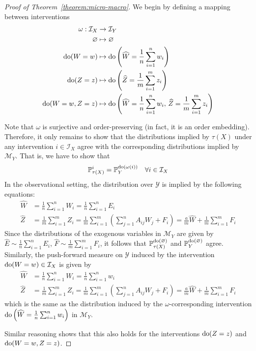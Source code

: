 \begin{proof}[Proof of Theorem~\ref{theorem:micro-macro}]
We begin by defining a mapping between interventions
\begin{align*}
\omega : \mathcal{I}_X &\rightarrow \mathcal{I}_Y \\
\varnothing &\mapsto \varnothing \\
\operatorname{do}(W= w)&\mapsto \operatorname{do}\left(\widehat{W} = \frac{1}{n}\sum_{i=1}^n w_i\right) \\
\operatorname{do}(Z= z)&\mapsto \operatorname{do}\left(\widehat{Z} = \frac{1}{m}\sum_{i=1}^m z_i\right) \\
\operatorname{do}(W=w, Z=z)&\mapsto \operatorname{do}\left(\widehat{W} = \frac{1}{n}\sum_{i=1}^n w_i,\, \widehat{Z} = \frac{1}{m}\sum_{i=1}^m z_i\right)
\end{align*}

Note that $\omega$ is surjective and order-preserving (in fact, it is an order embedding).
Therefore, it only remains to show that the distributions implied by $\tau(X)$ under any intervention $i\in\mathcal{I}_X$ agree with the corresponding distributions implied by $\mathcal{M}_Y$.
That is, we have to show that
\[ \mathbb{P}_{\tau(X)}^{i} = \mathbb{P}_{Y}^{\operatorname{do}(\omega(i))} \quad \forall i\in\mathcal{I}_X \]
%
In the observational setting, the distribution over $\mathcal{Y}$ is implied by the following equations:
%
\begin{align*}
\widehat{W} &= \frac{1}{n}\sum_{i=1}^n W_i = \frac{1}{n}\sum_{i=1}^n E_i \\
\widehat{Z} &= \frac{1}{m}\sum_{i=1}^m Z_i =  \frac{1}{m}\sum_{i=1}^m \left( \sum_{j=1}^n A_{ij}W_j  + F_i\right) = \frac{a}{m}\widehat{W} +  \frac{1}{m}\sum_{i=1}^m F_i
\end{align*}
%
Since the distributions of the exogenous variables in $\mathcal{M}_Y$ are given by $\widehat{E} \sim \frac{1}{n}\sum_{i=1}^n E_i$, $\widehat{F} \sim \frac{1}{m}\sum_{i=1}^m F_i$, it follows that $\mathbb{P}_{\tau(X)}^{\operatorname{do}(\varnothing)}$  and $\mathbb{P}_{Y}^{\operatorname{do}(\varnothing)}$ agree. Similarly, the push-forward measure on $\mathcal{Y}$ induced by the intervention $\operatorname{do}(W=w)\in\mathcal{I}_X$ is given by
%
\begin{align*}
\widehat{W} &= \frac{1}{n}\sum_{i=1}^n W_i = \frac{1}{n}\sum_{i=1}^n w_i \\
\widehat{Z} &= \frac{1}{m}\sum_{i=1}^m Z_i =  \frac{1}{m}\sum_{i=1}^m \left( \sum_{j=1}^n A_{ij}W_j  + F_i\right) = \frac{a}{m}\widehat{W} +  \frac{1}{m}\sum_{i=1}^m F_i
\end{align*}
which is the same as the distribution induced by the $\omega$-corresponding intervention $\operatorname{do}\left(\widehat{W} = \frac{1}{n}\sum_{i=1}^n w_i\right)$ in $\mathcal{M}_Y$.

Similar reasoning shows that this also holds for the interventions $\operatorname{do}(Z=z)$ and $\operatorname{do}(W=w, Z=z)$.

\end{proof}





